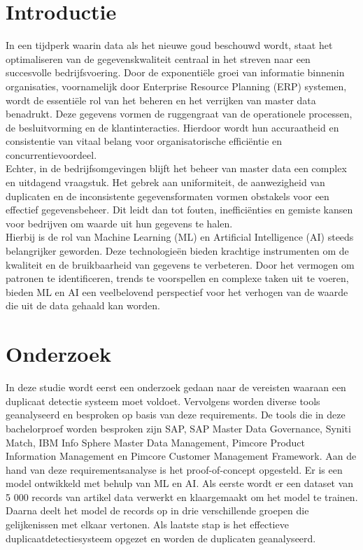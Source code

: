 \documentclass[a0,portrait]{hogent-poster}
\begin{document}
\begin{multicols}{2} %

\section{Introductie}

In een tijdperk waarin data als het nieuwe goud beschouwd wordt, staat het optimaliseren van de gegevenskwaliteit centraal in het streven naar een succesvolle bedrijfsvoering. Door de exponentiële groei van informatie binnenin organisaties, voornamelijk door Enterprise Resource Planning (ERP) systemen, wordt de essentiële rol van het beheren en het verrijken van master data benadrukt. Deze gegevens vormen de ruggengraat van de operationele processen, de besluitvorming en de klantinteracties. Hierdoor wordt hun accuraatheid en consistentie van vitaal belang voor organisatorische efficiëntie en concurrentievoordeel.
\\
Echter, in de bedrijfsomgevingen blijft het beheer van master data een complex en uitdagend vraagstuk. Het gebrek aan uniformiteit, de aanwezigheid van duplicaten en de inconsistente gegevensformaten vormen obstakels voor een effectief gegevensbeheer. Dit leidt dan tot fouten, inefficiënties en gemiste kansen voor bedrijven om waarde uit hun gegevens te halen. 
\\
Hierbij is de rol van Machine Learning (ML) en Artificial Intelligence (AI) steeds belangrijker geworden. Deze technologieën bieden krachtige instrumenten om de kwaliteit en de bruikbaarheid van gegevens te verbeteren. Door het vermogen om patronen te identificeren, trends te voorspellen en complexe taken uit te voeren, bieden ML en AI een veelbelovend perspectief voor het verhogen van de waarde die uit de data gehaald kan worden.

\section{Onderzoek}

In deze studie wordt eerst een onderzoek gedaan naar de vereisten waaraan een duplicaat detectie systeem moet voldoet. Vervolgens worden diverse tools geanalyseerd en besproken op basis van deze requirements. De tools die in deze bachelorproef worden besproken zijn SAP, SAP Master Data Governance, Syniti Match, IBM Info Sphere Master Data Management, Pimcore Product Information Management en Pimcore Customer Management Framework. Aan de hand van deze requirementsanalyse is het proof-of-concept opgesteld. Er is een model ontwikkeld met behulp van ML en AI. Als eerste wordt er een dataset van 5 000 records van artikel data verwerkt en klaargemaakt om het model te trainen. Daarna deelt het model de records op in drie verschillende groepen die gelijkenissen met elkaar vertonen. Als laatste stap is het effectieve duplicaatdetectiesysteem opgezet en worden de duplicaten geanalyseerd. 


\end{multicols}
\end{document}
